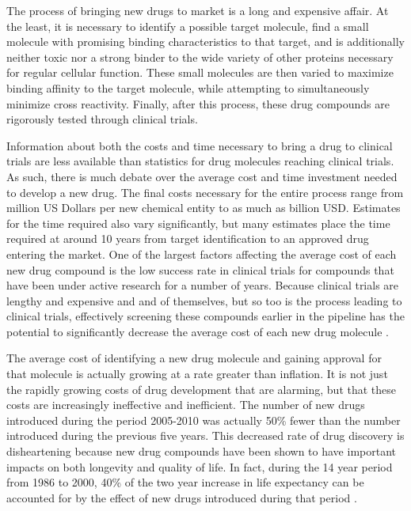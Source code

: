 The process of bringing new drugs to market is a long and expensive affair.
At the least, it is necessary to identify a possible target molecule, find a small molecule with promising binding characteristics to that target, and is additionally neither toxic nor a strong binder to the wide variety of other proteins necessary for regular cellular function.
These small molecules are then varied to maximize binding affinity to the target molecule, while attempting to simultaneously minimize cross reactivity.
Finally, after this process, these drug compounds are rigorously tested through clinical trials.

Information about both the costs and time necessary to bring a drug to clinical trials are less available than statistics for drug molecules reaching clinical trials.
As such, there is much debate over the average cost and time investment needed to develop a new drug.
The final costs necessary for the entire process range from  million US Dollars per new chemical entity to as much as  billion USD.
Estimates for the time required also vary significantly, but many estimates place the time required at around 10 years from target identification to an approved drug entering the market.
One of the largest factors affecting the average cost of each new drug compound is the low success rate in clinical trials for compounds that have been under active research for a number of years.
Because clinical trials are lengthy and expensive and and of themselves, but so too is the process leading to clinical trials, effectively screening these compounds earlier in the pipeline has the potential to significantly decrease the average cost of each new drug molecule \cite{adams2006estimating}.

The average cost of identifying a new drug molecule and gaining approval for that molecule is actually growing at a rate greater than inflation.
It is not just the rapidly growing costs of drug development that are alarming, but that these costs are increasingly ineffective and inefficient.
The number of new drugs introduced during the period 2005-2010 was actually 50\% fewer than the number introduced during the previous five years.
This decreased rate of drug discovery is disheartening because new drug compounds have been shown to have important impacts on both longevity and quality of life.
In fact, during the 14 year period from 1986 to 2000, 40\% of the two year increase in life expectancy can be accounted for by the effect of new drugs introduced during that period \cite{paul2010improve}.


